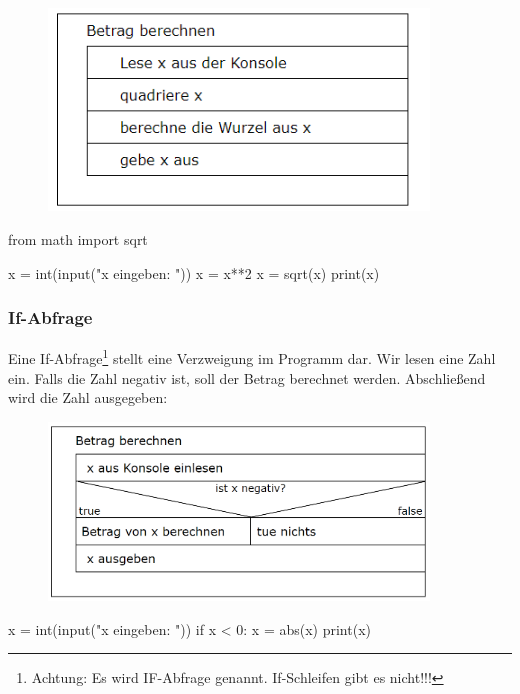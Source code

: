 \begin{minipage}{.45\textwidth}
\centering
\begin{figure}[H]
	\begin{center}
		\includegraphics[width=0.9\textwidth]{imgs/abs_long.png} %
	\end{center}
\end{figure}
\end{minipage}
\begin{minipage}{.45\textwidth}
\begin{python}
from math import sqrt

x = int(input("x eingeben: "))
x = x**2
x = sqrt(x)
print(x)
\end{python}
\end{minipage}
\subsubsection{If-Abfrage}

Eine If-Abfrage\footnote{Achtung: Es wird IF-Abfrage genannt. If-Schleifen gibt es nicht!!!} stellt eine Verzweigung im Programm dar. Wir lesen eine Zahl ein. Falls die Zahl negativ ist, soll der Betrag berechnet werden. Abschließend wird die Zahl ausgegeben:\\

\begin{minipage}{.45\textwidth}
\centering
\begin{figure}[H]
	\begin{center}
		\includegraphics[width=0.9\textwidth]{imgs/if_clause.png} %
	\end{center}
\end{figure}
\end{minipage}
\begin{minipage}{.45\textwidth}
\begin{python}
x = int(input("x eingeben: "))
if x < 0:
	x = abs(x)
print(x)
\end{python}
\end{minipage}

